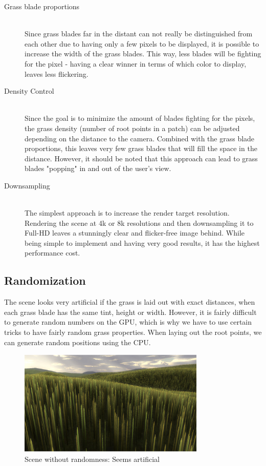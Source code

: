 \documentclass[conference]{acmsiggraph}
\begin{document}
\begin{description}
  \item[Grass blade proportions] \hfill \\
  Since grass blades far in the distant can not really be distinguished from each other due to having only a few pixels to be displayed, it is possible to increase the width of the grass blades. This way, less blades will be fighting for the pixel - having a clear winner in terms of which color to display, leaves less flickering.
  \item[Density Control] \hfill \\
  Since the goal is to minimize the amount of blades fighting for the pixels, the grass density (number of root points in a patch) can be adjusted depending on the distance to the camera. Combined with the grass blade proportions, this leaves very few grass blades that will fill the space in the distance. However, it should be noted that this approach can lead to grass blades "popping" in and out of the user's view.
  \item[Downsampling] \hfill \\
  The simplest approach is to increase the render target resolution. Rendering the scene at 4k or 8k resolutions and then downsampling it to Full-HD leaves a stunningly clear and flicker-free image behind. While being simple to implement and having very good results, it has the highest performance cost. 
\end{description}

\subsection{Randomization}

The scene looks very artificial if the grass is laid out with exact distances, when each grass blade has the same tint, height or width. However, it is fairly difficult to generate random numbers on the GPU, which is why we have to use certain tricks to have fairly random grass properties. When laying out the root points, we can generate random positions using the CPU.

 \begin{figure}[ht]
   \centering
   \includegraphics[width=3.5in]{images/no_randomness}
   \caption{Scene without randomness: Seems artificial}
 \end{figure}
\end{document}
